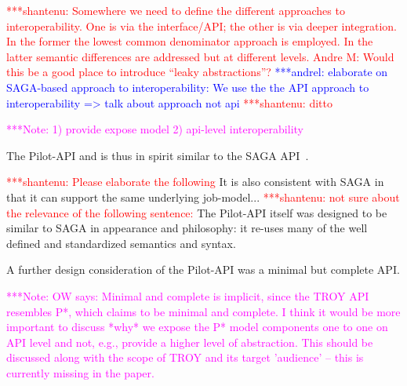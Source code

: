 \documentclass[conference,final]{IEEEtran}
\newcommand{\jhanote}[1]{ {\textcolor{red} { ***shantenu: #1 }}}
\newcommand{\alnote}[1]{ {\textcolor{blue} { ***andrel: #1 }}}
\newcommand{\note}[1]{ {\textcolor{magenta} { ***Note: #1 }}}
\newcommand{\alnote}[1]{}
\newcommand{\jhanote}[1]{}
\newcommand{\note}[1]{}
\begin{document}
\jhanote{Somewhere we need to define the different approaches to
  interoperability. One is via the interface/API; the other is via
  deeper integration. In the former the lowest common denominator
  approach is employed. In the latter semantic differences are
  addressed but at different levels. Andre M: Would this be a good
  place to introduce ``leaky abstractions''?}  \alnote{elaborate on
  SAGA-based approach to interoperability: We use the the API approach
  to interoperability => talk about approach not api}\jhanote{ditto}

\note{1) provide expose model 2) api-level interoperability}

The Pilot-API and is thus in spirit similar to the SAGA
API~\cite{saga_url}.

\jhanote{Please elaborate the following} It is also consistent with
SAGA in that it can support the same underlying job-model...
\jhanote{ not sure about the relevance of the following sentence:} The
Pilot-API itself was designed to be similar to SAGA in appearance and
philosophy: it re-uses many of the well defined and standardized
semantics and syntax.


A further design consideration of the Pilot-API was a minimal but
complete API.

\note{OW says: Minimal and complete is implicit, since the TROY API
resembles P*, which claims to be minimal and complete. I think it would 
be more important to discuss *why* we expose the P* model components one to one
on API level and not, e.g., provide a higher level of abstraction.
This should be discussed along with the scope of TROY and its
target 'audience' -- this is currently missing in the paper.}

\end{document}
